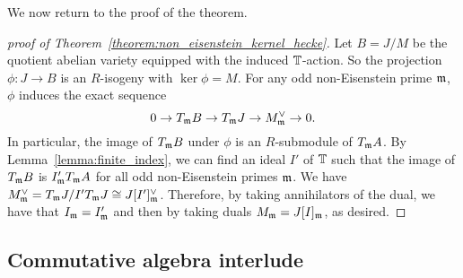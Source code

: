 \documentclass{article}
\begin{document}
We now return to the proof of the theorem.

\begin{proof}[proof of Theorem~\ref{theorem:non_eisenstein_kernel_hecke}]
    Let $B=J/M$ be the quotient abelian variety equipped with the induced
    $\mathbb{T}$-action. So the projection $\phi:J \to B$ is an $R$-isogeny with
    $\ker\phi = M$. For any odd non-Eisenstein prime $\mathfrak{m}$, $\phi$ induces the
    exact sequence
    \[ 
        0 \to T_{\mathfrak{m}} B \to T_{\mathfrak{m}} J \to M^\vee _{\mathfrak{m}} \to 0.
    \] 
    In particular, the image of $T_{\mathfrak{m}} B$ under $\phi$ is an $R$-submodule of
    $T_{\mathfrak{m}} A$. By Lemma~\ref{lemma:finite_index}, we can find an ideal $I'$ of
    $\mathbb{T}$ such that the image of $T_{\mathfrak{m}} B$ is $I' _{\mathfrak{m}} T_{\mathfrak{m}} A$ for all odd
    non-Eisenstein primes $\mathfrak{m}$. We have $M^\vee _{\mathfrak{m}} = T_{\mathfrak{m}} J / I' T_{\mathfrak{m}}
    J\cong J[I']_{\mathfrak{m}} ^\vee$. Therefore, by taking annihilators of the dual, we
    have that $I_{\mathfrak{m}} = I'_{\mathfrak{m}}$ and then by taking duals $M_{\mathfrak{m}} = J[I]_{\mathfrak{m}}$, as
    desired.
\end{proof}

\subsection{Commutative algebra interlude}%
\label{sub:commutative_algebra_interlude}
\end{document}
